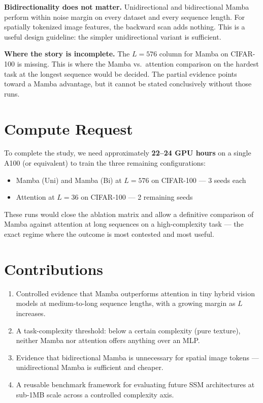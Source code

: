 \documentclass[11pt, a4paper]{article}
\begin{document}
\textbf{Bidirectionality does not matter.}
Unidirectional and bidirectional Mamba perform within noise margin on every dataset
and every sequence length. For spatially tokenized image features, the backward
scan adds nothing. This is a useful design guideline: the simpler unidirectional
variant is sufficient.

\textbf{Where the story is incomplete.}
The $L=576$ column for Mamba on CIFAR-100 is missing. This is where the Mamba
vs.\ attention comparison on the hardest task at the longest sequence would be
decided. The partial evidence points toward a Mamba advantage, but it cannot
be stated conclusively without those runs.

\section{Compute Request}

To complete the study, we need approximately \textbf{22--24 GPU hours} on a single
A100 (or equivalent) to train the three remaining configurations:

\begin{itemize}
    \item Mamba (Uni) and Mamba (Bi) at $L=576$ on CIFAR-100 — 3 seeds each
    \item Attention at $L=36$ on CIFAR-100 — 2 remaining seeds
\end{itemize}

These runs would close the ablation matrix and allow a definitive comparison of
Mamba against attention at long sequences on a high-complexity task — the exact
regime where the outcome is most contested and most useful.

\section{Contributions}

\begin{enumerate}
    \item Controlled evidence that Mamba outperforms attention in tiny hybrid vision
    models at medium-to-long sequence lengths, with a growing margin as $L$ increases.
    \item A task-complexity threshold: below a certain complexity (pure texture),
    neither Mamba nor attention offers anything over an MLP.
    \item Evidence that bidirectional Mamba is unnecessary for spatial image tokens —
    unidirectional Mamba is sufficient and cheaper.
    \item A reusable benchmark framework for evaluating future SSM architectures
    at sub-1MB scale across a controlled complexity axis.
\end{enumerate}
\end{document}
